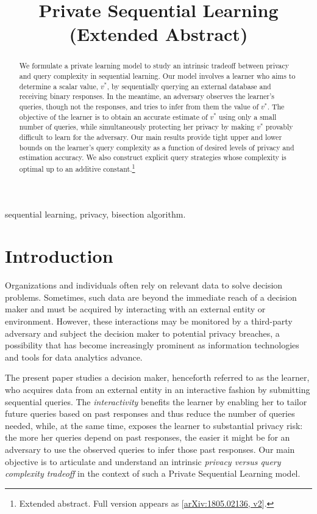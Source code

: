 \documentclass[final,12pt]{colt2018}
\title[Private Sequential Learning]{Private Sequential Learning \\ (Extended Abstract)}
\begin{document}
\maketitle

\begin{abstract}


{We {formulate} a private {learning} model to study an intrinsic tradeoff between privacy and query complexity in {sequential learning}. Our model involves a {learner} who aims to determine a scalar value, $v^*$, {by} sequentially querying an external database and receiving binary responses. {In the meantime, an adversary observes the {learner}'s queries, though not 
{the} responses, and tries to infer from them the value of $v^*$.} {The objective of the {learner} is to obtain an accurate estimate of $v^*$ using only a small number of queries, while simultaneously protecting her privacy by making $v^*$ provably difficult to learn for the adversary.}} {Our main results} provide tight upper and lower bounds on the {learner}'s {query complexity} as a function of desired levels of privacy and {estimation accuracy}. We also construct explicit query strategies whose complexity is optimal up to an additive constant.\footnote{Extended abstract. Full version appears as [\href{https://arxiv.org/abs/1805.02136}{arXiv:1805.02136, v2}].}

\end{abstract}

\begin{keywords}
sequential learning, privacy, {bisection algorithm}.
\end{keywords}


\section{Introduction}

Organizations and individuals often rely on relevant data to solve decision problems. Sometimes, such data are beyond the immediate reach of a decision maker and must be acquired %
{by}
interacting with an external entity or environment. However, these interactions may be monitored by a third-party adversary and subject the decision maker to potential privacy breaches, a possibility that has become increasingly prominent as information technologies and tools for data analytics advance. 

The present paper studies a decision maker, henceforth referred to as the {{learner}}, who acquires data from an external entity in an {interactive} fashion by submitting sequential queries. The \emph{interactivity} benefits the {learner} by enabling her to tailor future queries based on past responses and thus reduce the number of queries needed, while, at the same time, exposes the {learner} to substantial privacy risk: the more her queries depend on past responses, the easier it might be for an {adversary} to use the observed queries to infer those past responses. 
Our main objective is to articulate and understand an intrinsic \emph{privacy versus query complexity tradeoff} in the context of such a {Private Sequential Learning} model. 
\end{document}
